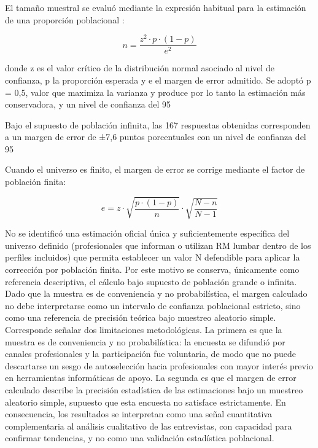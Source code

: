 El tamaño muestral se evaluó mediante la expresión habitual para la estimación de una proporción poblacional \parencite{cochran_sampling_techniques_1977}:

\begin{equation}
n = \frac{z^2 \cdot p \cdot (1 - p)}{e^2}
\end{equation}

donde z es el valor crítico de la distribución normal asociado al nivel de confianza, p la proporción esperada y e el margen de error admitido. Se adoptó p = 0,5, valor que maximiza la varianza y produce por lo tanto la estimación más conservadora, y un nivel de confianza del 95 %

Bajo el supuesto de población infinita, las 167 respuestas obtenidas corresponden a un margen de error de ±7,6 puntos porcentuales con un nivel de confianza del 95 %

Cuando el universo es finito, el margen de error se corrige mediante el factor de población finita:

\begin{equation}
e = z \cdot \sqrt{\frac{p \cdot (1 - p)}{n}} \cdot \sqrt{\frac{N - n}{N - 1}}
\end{equation}

No se identificó una estimación oficial única y suficientemente específica del universo definido (profesionales que informan o utilizan RM lumbar dentro de los perfiles incluidos) que permita establecer un valor N defendible para aplicar la corrección por población finita. Por este motivo se conserva, únicamente como referencia descriptiva, el cálculo bajo supuesto de población grande o infinita. Dado que la muestra es de conveniencia y no probabilística, el margen calculado no debe interpretarse como un intervalo de confianza poblacional estricto, sino como una referencia de precisión teórica bajo muestreo aleatorio simple. Corresponde señalar dos limitaciones metodológicas. La primera es que la muestra es de conveniencia y no probabilística: la encuesta se difundió por canales profesionales y la participación fue voluntaria, de modo que no puede descartarse un sesgo de autoselección hacia profesionales con mayor interés previo en herramientas informáticas de apoyo. La segunda es que el margen de error calculado describe la precisión estadística de las estimaciones bajo un muestreo aleatorio simple, supuesto que esta encuesta no satisface estrictamente. En consecuencia, los resultados se interpretan como una señal cuantitativa complementaria al análisis cualitativo de las entrevistas, con capacidad para confirmar tendencias, y no como una validación estadística poblacional.

